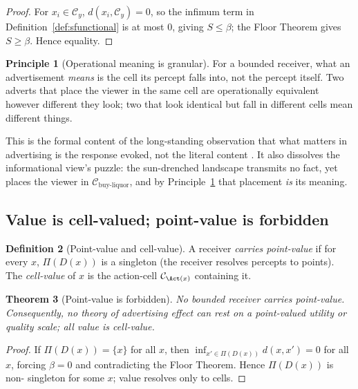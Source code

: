 \documentclass[twocolumn,11pt,a4paper]{article}
\theoremstyle{adv}
\newtheorem{theorem}{Theorem}[section]
\theoremstyle{definition}
\newtheorem{definition}[theorem]{Definition}
\newtheorem{principle}[theorem]{Principle}
\theoremstyle{remark}
\newcommand{\Cell}{\mathcal{C}}        %
\newcommand{\Dec}{D}                   %
\newcommand{\Proj}{\Pi}                %
\newcommand{\Sval}{S}                  %
\newcommand{\floor}{\beta}            %
\newcommand{\dist}{d}
\begin{document}
\begin{proof}
For $x_i\in\Cell_y$, $\dist(x_i,\Cell_y)=0$, so the infimum term in
Definition~\ref{def:sfunctional} is at most $0$, giving
$\Sval\le\floor$; the Floor Theorem gives $\Sval\ge\floor$. Hence equality.
\end{proof}

\begin{principle}[Operational meaning is granular]
\label{prin:granular}
For a bounded receiver, what an advertisement \emph{means} is the cell its
percept falls into, not the percept itself. Two adverts that place the
viewer in the same cell are operationally equivalent however different
they look; two that look identical but fall in different cells mean
different things.
\end{principle}

This is the formal content of the long-standing observation that what
matters in advertising is the response evoked, not the literal content
\citep{krugman1965,vakratsas1999}. It also dissolves the informational
view's puzzle: the sun-drenched landscape transmits no fact, yet places
the viewer in $\Cell_{\text{buy-liquor}}$, and by
Principle~\ref{prin:granular} that placement \emph{is} its meaning.

\subsection{Value is cell-valued; point-value is forbidden}

\begin{definition}[Point-value and cell-value]
\label{def:pointvalue}
A receiver \emph{carries point-value} if for every $x$, $\Proj(\Dec(x))$
is a singleton (the receiver resolves percepts to points). The
\emph{cell-value} of $x$ is the action-cell $\Cell_{\Act(x)}$ containing
it.
\end{definition}

\begin{theorem}[Point-value is forbidden]
\label{thm:nopoint}
No bounded receiver carries point-value. Consequently, no theory of
advertising effect can rest on a point-valued utility or quality scale;
all value is cell-value.
\end{theorem}

\begin{proof}
If $\Proj(\Dec(x))=\{x\}$ for all $x$, then
$\inf_{x'\in\Proj(\Dec(x))}\dist(x,x')=0$ for all $x$, forcing $\floor=0$
and contradicting the Floor Theorem. Hence $\Proj(\Dec(x))$ is non-
singleton for some $x$; value resolves only to cells.
\end{proof}
\end{document}
